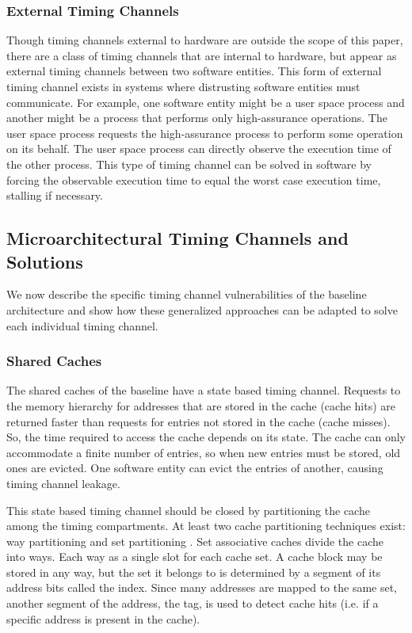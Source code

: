 \subsubsection{External Timing Channels}
Though timing channels external to hardware are outside the scope of this 
paper, there are a class of timing channels that are internal to hardware, but 
appear as external timing channels between two software entities. This form of 
external timing channel exists in systems where distrusting software entities 
must communicate. For example, one software entity might be a user space 
process and another might be a process that performs only high-assurance 
operations. The user space process requests the high-assurance process to 
perform some operation on its behalf. The user space process can directly 
observe the execution time of the other process. This type of timing channel 
can be solved in software by forcing the observable execution time to 
equal the worst case execution time, stalling if necessary.

\subsection{Microarchitectural Timing Channels and Solutions}
We now describe the specific timing channel vulnerabilities of the baseline 
architecture and show how these generalized approaches can be adapted to solve 
each individual timing channel.
\subsubsection{Shared Caches}
The shared caches of the baseline have a state based timing channel. Requests 
to the memory hierarchy for addresses that are stored in the cache (cache hits) 
are returned faster than requests for entries not stored in the cache (cache 
misses). So, the time required to access the cache depends on its state. The 
cache can only accommodate a finite number of entries, so when new entries must 
be stored, old ones are evicted. One software entity can evict the entries of 
another, causing timing channel leakage.

This state based timing channel should be closed by partitioning the cache 
among the timing compartments. At least two cache partitioning techniques 
exist: way partitioning and set partitioning 
\cite{rtas_cache_framework,dynamic_partitioning}. Set associative caches divide 
the cache into ways. Each way as a single slot for each cache set. A cache 
block may be stored in any way, but the set it belongs to is determined by a 
segment of its address bits called the index. Since many addresses are mapped 
to the same set, another segment of the address, the tag, is used to detect 
cache hits (i.e. if a specific address is present in the cache).


